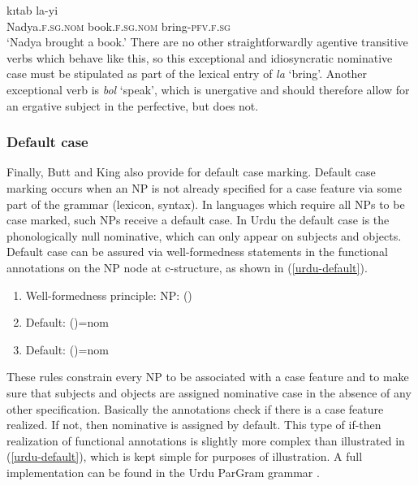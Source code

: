 \documentclass[output=paper,hidelinks]{langscibook}
\begin{document}
\ea \label{ex:urdu-la}
 {k{\i}tab}  {la-yi} \\
{Nadya.\textsc{f.sg.nom}} {book.\textsc{f.sg.nom}} {bring-\textsc{pfv.f.sg}} \\
\glt `Nadya brought a book.'
\z
There are no other straightforwardly agentive transitive verbs which behave like
this, so this
exceptional and idiosyncratic nominative case must be stipulated as
part of the lexical entry of  {\em la} `bring'.   Another exceptional verb is
\textit{bol} `speak', which is unergative and should therefore allow for an
ergative subject in the perfective, but does not. 



\subsubsection{Default case}

Finally, Butt and King also provide for default case marking.  Default case
marking occurs when an NP is not already specified for a case feature via some
part of the grammar (lexicon, syntax).  In languages which require all NPs to be
case marked, such NPs receive a default case. 
In Urdu the default case is the phonologically null
nominative, which can only appear on subjects and objects.  Default case can be
assured via well-formedness statements in the functional annotations on the
NP node at 
c-structure, as shown in (\ref{urdu-default}).


\ea \label{urdu-default} 
\begin{enumerate}
\item Well-formedness principle: NP: (\UP\CASE)
\item Default: (\UP\SUBJ\CASE)={\sc nom}
 \label{defaultnom}
\item Default: (\UP\OBJ\CASE)={\sc nom}
  \end{enumerate}
  \z 

  These rules constrain every NP to be associated with a case feature and to
  make sure that subjects and objects are assigned nominative case in the
  absence of any other specification.  Basically the
  annotations check if there is a case feature realized.  If not, then
  nominative is assigned by default. This type of if-then realization of
  functional annotations is slightly more complex than illustrated in (\ref{urdu-default}),
  which is kept simple for purposes of illustration.  A full implementation can
  be found in the Urdu ParGram grammar \citep{buttking02,boegeletal09}.
\end{document}
